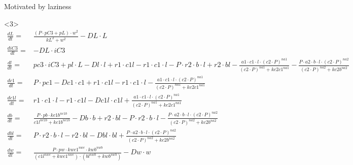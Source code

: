 \documentclass{beamer}
\begin{document}
\begin{frame}[fragile]{Motivated by laziness}
  \begin{onlyenv}<3>
    \Tiny
    \begin{align}
      \frac{dL}{dt} =& \frac{\left( P \cdot pC3 + pL \right) \cdot w^{2}}{kL^{2} + w^{2}} - DL \cdot L \\
      \frac{diC3}{dt} =&  - DL \cdot iC3 \\
      \frac{dl}{dt} =& pc3 \cdot iC3 + pl \cdot L - Dl \cdot l + r1 \cdot c1l - r1 \cdot c1 \cdot l - P \cdot r2 \cdot b \cdot l + r2 \cdot bl - \frac{a1 \cdot c1 \cdot l \cdot \left( c2 \cdot P \right)^{na1}}{\left( c2 \cdot P \right)^{na1} + kc2c1^{na1}} - \frac{P \cdot a2 \cdot b \cdot l \cdot \left( c2 \cdot P \right)^{na2}}{\left( c2 \cdot P \right)^{na2} + kc2b^{na2}} \\
      \frac{dc1}{dt} =& P \cdot pc1 - Dc1 \cdot c1 + r1 \cdot c1l - r1 \cdot c1 \cdot l - \frac{a1 \cdot c1 \cdot l \cdot \left( c2 \cdot P \right)^{na1}}{\left( c2 \cdot P \right)^{na1} + kc2c1^{na1}} \\
      \frac{dc1l}{dt} =& r1 \cdot c1 \cdot l - r1 \cdot c1l - Dc1l \cdot c1l + \frac{a1 \cdot c1 \cdot l \cdot \left( c2 \cdot P \right)^{na1}}{\left( c2 \cdot P \right)^{na1} + kc2c1^{na1}} \\
      \frac{db}{dt} =& \frac{P \cdot pb \cdot kc1b^{nc1b}}{c1l^{nc1b} + kc1b^{nc1b}} - Db \cdot b + r2 \cdot bl - P \cdot r2 \cdot b \cdot l - \frac{P \cdot a2 \cdot b \cdot l \cdot \left( c2 \cdot P \right)^{na2}}{\left( c2 \cdot P \right)^{na2} + kc2b^{na2}} \\
      \frac{dbl}{dt} =& P \cdot r2 \cdot b \cdot l - r2 \cdot bl - Dbl \cdot bl + \frac{P \cdot a2 \cdot b \cdot l \cdot \left( c2 \cdot P \right)^{na2}}{\left( c2 \cdot P \right)^{na2} + kc2b^{na2}} \\
      \frac{dw}{dt} =& \frac{P \cdot pw \cdot kwc1^{nwc} \cdot kwb^{nwb}}{\left( c1l^{nwc} + kwc1^{nwc} \right) \cdot \left( bl^{nwb} + kwb^{nwb} \right)} - Dw \cdot w \\
    \end{align}

  \end{onlyenv}

\end{frame}
\end{document}
